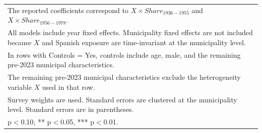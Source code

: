 \begin{table}[!htbp]
\begin{tabular}{llccr}
\multicolumn{5}{l}{\footnotesize The reported coefficients correspond to $X \times Share_{1936-1955}$ and $X \times Share_{1956-1978}$.} \\
\multicolumn{5}{l}{\footnotesize All models include year fixed effects. Municipality fixed effects are not included because $X$ and Spanish exposure are time-invariant at the municipality level.} \\
\multicolumn{5}{l}{\footnotesize In rows with Controls = Yes, controls include age, male, and the remaining pre-2023 municipal characteristics.} \\
\multicolumn{5}{l}{\footnotesize The remaining pre-2023 municipal characteristics exclude the heterogeneity variable $X$ used in that row.} \\
\multicolumn{5}{l}{\footnotesize Survey weights are used. Standard errors are clustered at the municipality level. Standard errors are in parentheses.} \\
\multicolumn{5}{l}{\footnotesize * p$<$0.10, ** p$<$0.05, *** p$<$0.01.} \\
\end{tabular}
\end{table}
